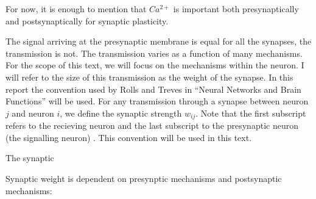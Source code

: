 














For now, it is enough to mention that  $Ca^{2+}$ is important both presynaptically and postsynaptically for synaptic plasticity.












The signal arriving at the presynaptic membrane is equal for all the synapses, the transmission is not. 
The transmission varies as a function of many mechanisms. %
For the scope of this text, we will focus on the mechanisms within the neuron. 
I will refer to the size of this transmission as the weight of the synapse. 
In this report the convention used by Rolls and Treves in ``Neural Networks and Brain Functions'' will be used. 
For any transmission through a synapse between neuron $j$ and neuron $i$, we define the synaptic strength $w_{ij}$. 
Note that the first subscript refers to the recieving neuron and the last subscript to the presynaptic neuron (the signalling neuron) \cite{TrevesNeuralNetworks}.
This convention will be used in this text. 

The synaptic 





Synaptic weight is dependent on presynptic mechanisms and postsynaptic mechanisms:


